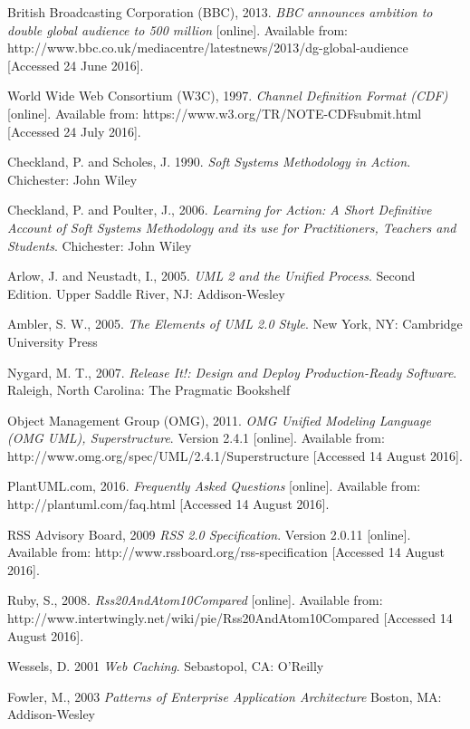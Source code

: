 \documentclass{article}
\begin{document}
\begin{thebibliography}{9}

British Broadcasting Corporation (BBC), 2013.
\textit{BBC announces ambition to double global audience to 500 million} [online].
Available from: http://www.bbc.co.uk/mediacentre/latestnews/2013/dg-global-audience [Accessed 24 June 2016].

World Wide Web Consortium (W3C), 1997.
\textit{Channel Definition Format (CDF)} [online].
Available from: https://www.w3.org/TR/NOTE-CDFsubmit.html
[Accessed 24 July 2016].

Checkland, P. and Scholes, J. 1990.
\textit{Soft Systems Methodology in Action}.
Chichester: John Wiley

Checkland, P. and Poulter, J., 2006.
\textit{Learning for Action: A Short Definitive Account of Soft Systems Methodology and its use for Practitioners, Teachers and Students}.
Chichester: John Wiley

Arlow, J. and Neustadt, I., 2005.
\textit{UML 2 and the Unified Process}. Second Edition.
Upper Saddle River, NJ: Addison-Wesley

Ambler, S. W., 2005.
\textit{The Elements of UML 2.0 Style}.
New York, NY: Cambridge University Press

Nygard, M. T., 2007.
\textit{Release It!: Design and Deploy Production-Ready Software}.
Raleigh, North Carolina: The Pragmatic Bookshelf

Object Management Group (OMG), 2011.
\textit{OMG Unified Modeling Language (OMG UML), Superstructure}. Version 2.4.1 [online].
Available from: http://www.omg.org/spec/UML/2.4.1/Superstructure
[Accessed 14 August 2016].

PlantUML.com, 2016.
\textit{Frequently Asked Questions} [online].
Available from: http://plantuml.com/faq.html
[Accessed 14 August 2016].

RSS Advisory Board, 2009
\textit{RSS 2.0 Specification}. Version 2.0.11 [online].
Available from: http://www.rssboard.org/rss-specification
[Accessed 14 August 2016].

Ruby, S., 2008.
\textit{Rss20AndAtom10Compared} [online].
Available from: http://www.intertwingly.net/wiki/pie/Rss20AndAtom10Compared
[Accessed 14 August 2016].

Wessels, D. 2001
\textit{Web Caching}.
Sebastopol, CA: O'Reilly

Fowler, M., 2003
\textit{Patterns of Enterprise Application Architecture}
Boston, MA: Addison-Wesley

\end{thebibliography}
\end{document}
